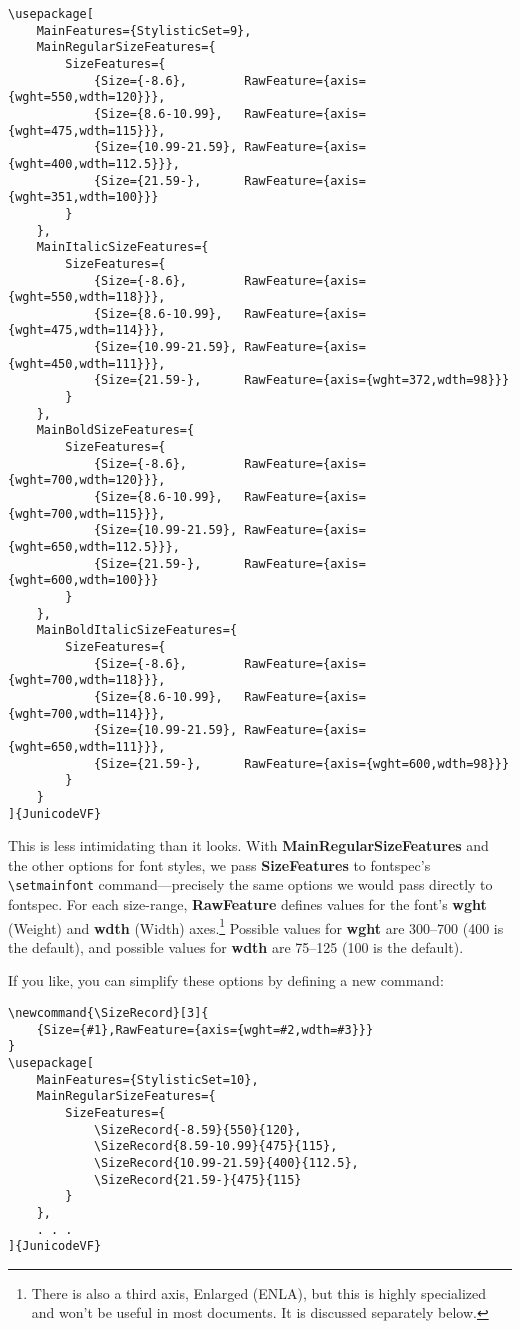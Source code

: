 \documentclass[12pt]{article}
\newcommand{\SizeRecord}[3]{{Size={#1},RawFeature={axis={wght=#2,wdth=#3}}}}
\newcommand{\fspec}{{\sffamily fontspec}}
\begin{document}
\footnotesize
\begin{verbatim}
\usepackage[
    MainFeatures={StylisticSet=9},
    MainRegularSizeFeatures={
        SizeFeatures={
            {Size={-8.6},        RawFeature={axis={wght=550,wdth=120}}},
            {Size={8.6-10.99},   RawFeature={axis={wght=475,wdth=115}}},
            {Size={10.99-21.59}, RawFeature={axis={wght=400,wdth=112.5}}},
            {Size={21.59-},      RawFeature={axis={wght=351,wdth=100}}}
        }
    },
    MainItalicSizeFeatures={
        SizeFeatures={
            {Size={-8.6},        RawFeature={axis={wght=550,wdth=118}}},
            {Size={8.6-10.99},   RawFeature={axis={wght=475,wdth=114}}},
            {Size={10.99-21.59}, RawFeature={axis={wght=450,wdth=111}}},
            {Size={21.59-},      RawFeature={axis={wght=372,wdth=98}}}
        }
    },
    MainBoldSizeFeatures={
        SizeFeatures={
            {Size={-8.6},        RawFeature={axis={wght=700,wdth=120}}},
            {Size={8.6-10.99},   RawFeature={axis={wght=700,wdth=115}}},
            {Size={10.99-21.59}, RawFeature={axis={wght=650,wdth=112.5}}},
            {Size={21.59-},      RawFeature={axis={wght=600,wdth=100}}}
        }
    },
    MainBoldItalicSizeFeatures={
        SizeFeatures={
            {Size={-8.6},        RawFeature={axis={wght=700,wdth=118}}},
            {Size={8.6-10.99},   RawFeature={axis={wght=700,wdth=114}}},
            {Size={10.99-21.59}, RawFeature={axis={wght=650,wdth=111}}},
            {Size={21.59-},      RawFeature={axis={wght=600,wdth=98}}}
        }
    }
]{JunicodeVF}
\end{verbatim}
\normalsize

\noindent This is less intimidating than it looks. With
\textbf{MainRegularSizeFeatures} and the other options for font styles, we pass \textbf{SizeFeatures}
to \fspec’s {\verb|\setmainfont|} command---precisely the same options
we would pass directly to {\fspec}.
For each size-range, \textbf{RawFeature} defines values for the font’s \textbf{wght} (Weight)
and \textbf{wdth} (Width) axes.\footnote{There is also a third axis, Enlarged (ENLA),
but this is highly specialized and won't be useful in most documents. It is
discussed separately below.} Possible values for \textbf{wght} are
300–700 (400 is the default), and possible values for \textbf{wdth} are 75–125
(100 is the default).

If you like, you can simplify these options by defining a new command:

\footnotesize
\begin{verbatim}
\newcommand{\SizeRecord}[3]{
    {Size={#1},RawFeature={axis={wght=#2,wdth=#3}}}
}
\usepackage[
    MainFeatures={StylisticSet=10},
    MainRegularSizeFeatures={
        SizeFeatures={
            \SizeRecord{-8.59}{550}{120},
            \SizeRecord{8.59-10.99}{475}{115},
            \SizeRecord{10.99-21.59}{400}{112.5},
            \SizeRecord{21.59-}{475}{115}
        }
    },
    . . .
]{JunicodeVF}
\end{verbatim}
\normalsize
\end{document}
